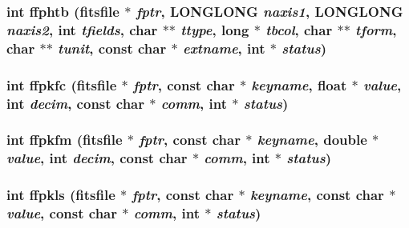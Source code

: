 \subsubsection{\setlength{\rightskip}{0pt plus 5cm}int ffphtb (\bf{fitsfile} $\ast$ {\em fptr}, \bf{LONGLONG} {\em naxis1}, \bf{LONGLONG} {\em naxis2}, int {\em tfields}, char $\ast$$\ast$ {\em ttype}, long $\ast$ {\em tbcol}, char $\ast$$\ast$ {\em tform}, char $\ast$$\ast$ {\em tunit}, const char $\ast$ {\em extname}, int $\ast$ {\em status})}\label{test_2roimasker_2fitsio_8h_97379ac653d2586699812086d52ad054}


\subsubsection{\setlength{\rightskip}{0pt plus 5cm}int ffpkfc (\bf{fitsfile} $\ast$ {\em fptr}, const char $\ast$ {\em keyname}, float $\ast$ {\em value}, int {\em decim}, const char $\ast$ {\em comm}, int $\ast$ {\em status})}\label{test_2roimasker_2fitsio_8h_f1222f8c91c04a9b03d9e11c5b199ea4}


\subsubsection{\setlength{\rightskip}{0pt plus 5cm}int ffpkfm (\bf{fitsfile} $\ast$ {\em fptr}, const char $\ast$ {\em keyname}, double $\ast$ {\em value}, int {\em decim}, const char $\ast$ {\em comm}, int $\ast$ {\em status})}\label{test_2roimasker_2fitsio_8h_1471beac55097602f6765917a191683b}


\subsubsection{\setlength{\rightskip}{0pt plus 5cm}int ffpkls (\bf{fitsfile} $\ast$ {\em fptr}, const char $\ast$ {\em keyname}, const char $\ast$ {\em value}, const char $\ast$ {\em comm}, int $\ast$ {\em status})}\label{test_2roimasker_2fitsio_8h_51811c05fbd0c303b0ca07d0a78e6674}


